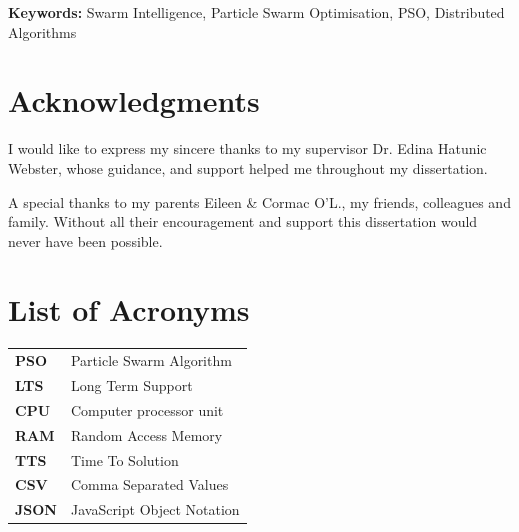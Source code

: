 \documentclass[oneside,12pt]{book}
\begin{document}
\vfill
\noindent
\textbf{Keywords:} \quad Swarm Intelligence, Particle Swarm Optimisation, PSO, Distributed Algorithms

\chapter*{Acknowledgments}

I would like to express my sincere thanks to my supervisor Dr. Edina Hatunic Webster, whose guidance, and support helped me throughout my dissertation. 

\vspace{5mm}

{\setlength{\parindent}{0cm}A special thanks to my parents Eileen \& Cormac O'L., my friends, colleagues and family. Without all their encouragement and support this dissertation would never have been possible.}

\newpage
\tableofcontents

\listoffigures

\listoftables

\lstlistoflistings

\chapter*{List of Acronyms}
\begin{table}[H]
  \centering
    \begin{tabular}{ l l }
    \textbf{PSO} & Particle Swarm Algorithm \\
    \textbf{LTS} & Long Term Support \\
    \textbf{CPU} & Computer processor unit \\
    \textbf{RAM} & Random Access Memory \\
    \textbf{TTS} & Time To Solution \\
    \textbf{CSV} & Comma Separated Values \\
    \textbf{JSON} & JavaScript Object Notation \\
    
    \end{tabular}
\end{table}

\newpage

\fancyhead[RE,LO]{\leftmark}
\renewcommand{\headrulewidth}{2pt}
\end{document}
